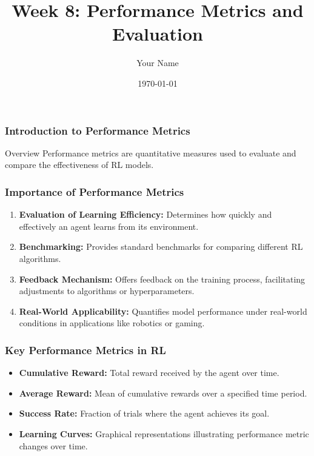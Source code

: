 \documentclass{beamer}
\title{Week 8: Performance Metrics and Evaluation}
\author{Your Name}
\institute{Your Institution}
\date{\today}
\begin{document}
\frame{\titlepage}

\begin{frame}[fragile]
    \frametitle{Introduction to Performance Metrics}
    \begin{block}{Overview}
        Performance metrics are quantitative measures used to evaluate and compare the effectiveness of RL models.
    \end{block}
\end{frame}

\begin{frame}[fragile]
    \frametitle{Importance of Performance Metrics}
    \begin{enumerate}
        \item \textbf{Evaluation of Learning Efficiency:} 
        Determines how quickly and effectively an agent learns from its environment.
        
        \item \textbf{Benchmarking:} 
        Provides standard benchmarks for comparing different RL algorithms.
        
        \item \textbf{Feedback Mechanism:} 
        Offers feedback on the training process, facilitating adjustments to algorithms or hyperparameters.
        
        \item \textbf{Real-World Applicability:} 
        Quantifies model performance under real-world conditions in applications like robotics or gaming.
    \end{enumerate}
\end{frame}

\begin{frame}[fragile]
    \frametitle{Key Performance Metrics in RL}
    \begin{itemize}
        \item \textbf{Cumulative Reward:} 
        Total reward received by the agent over time.
        
        \item \textbf{Average Reward:} 
        Mean of cumulative rewards over a specified time period.
        
        \item \textbf{Success Rate:} 
        Fraction of trials where the agent achieves its goal.
        
        \item \textbf{Learning Curves:} 
        Graphical representations illustrating performance metric changes over time.
    \end{itemize}
\end{frame}
\end{document}
